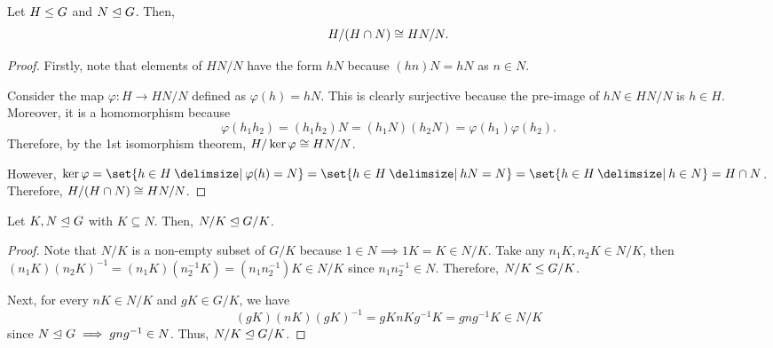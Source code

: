 \documentclass[11pt]{penrose}
\begin{document}
\begin{nthm}
    Let $H \mathrel{\leq} G$ and $N \mathrel{\trianglelefteq} G$. Then,
    \begin{equation*}
        H / (H \cap N) \mathrel{\cong} HN / N.
    \end{equation*}
\end{nthm}
\begin{proof}
    Firstly, note that elements of $HN/N$ have the form $hN$ because $(hn)N = hN$ as $n \in N$.

    Consider the map $\varphi : H \to HN/N$ defined as $\varphi(h) = hN$. This is clearly surjective because the pre-image of $hN \in HN/N$ is $h \in H$. Moreover, it is a homomorphism because
    \begin{equation*}
        \varphi( h_{1} h_{2} )
        = (h_{1} h_{2}) N
        = (h_{1}N) (h_{2}N)
        = \varphi(h_{1}) \varphi(h_{2}).
    \end{equation*}
    Therefore, by the 1st isomorphism theorem, $H / \ker\varphi \mathrel{\cong} HN / N$.

    However, $\ker\varphi = \set{h \in H \st \varphi(h) = N} = \set{h \in H \st hN = N} = \set{h \in H \st h \in N} = H \cap N$. Therefore, $H / (H \cap N) \mathrel{\cong} HN / N$.
\end{proof}

\begin{nlemma}
    Let $K, N \mathrel{\trianglelefteq} G$ with $K \subseteq N$. Then, $N/K \mathrel{\trianglelefteq} G/K$.
\end{nlemma}
\begin{proof}
    Note that $N/K$ is a non-empty subset of $G/K$ because $1 \in N \implies 1K = K \in N/K$. Take any $n_{1}K, n_{2}K \in N/K$, then $(n_{1}K) (n_{2}K)^{-1} = (n_{1}K) (n_{2}^{-1} K) = (n_{1} n_{2}^{-1}) K \in N/K$
    since $n_{1} n_{2}^{-1} \in N$. Therefore, $N/K \mathrel{\leq} G/K$.

    Next, for every $nK \in N/K$ and $gK \in G/K$, we have
    \begin{equation*}
        (gK) (nK) (gK)^{-1}
        = gK nK g^{-1}K
        = g n g^{-1 } K
        \in N/K
    \end{equation*}
    since $N \mathrel{\trianglelefteq} G \implies g n g^{-1 } \in N$. Thus, $N/K \mathrel{\trianglelefteq} G/K$.
\end{proof}
\end{document}
